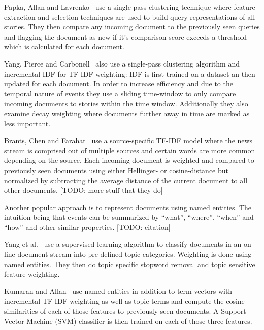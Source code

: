 Papka, Allan and Lavrenko~\cite{papka1998online} use a single-pass clustering technique where feature extraction and selection techniques are used to build query representations of all stories. They then compare any incoming document to the previously seen queries and flagging the document as new if it's comparison score exceeds a threshold which is calculated for each document.

Yang, Pierce and Carbonell~\cite{yang1998study} also use a single-pass clustering algorithm and incremental IDF for TF-IDF weighting: IDF is first trained on a dataset an then updated for each document. In order to increase efficiency and due to the temporal nature of events they use a sliding time-window to only compare incoming documents to stories within the time window. Additionally they also examine decay weighting where documents further away in time are marked as less important.

Brants, Chen and Farahat~\cite{brants2003system} use a source-specific TF-IDF model where the news stream is comprised out of multiple sources and certain words are more common depending on the source. Each incoming document is weighted and compared to previously seen documents using either Hellinger- or cosine-distance but normalized by subtracting the average distance of the current document to all other documents. [TODO: more stuff that they do]

Another popular approach is to represent documents using named entities. The intuition being that events can be summarized  by ``what'', ``where'', ``when'' and ``how'' and other similar properties. [TODO: citation]

Yang et al.~\cite{yang2002topic} use a supervised learning algorithm to classify documents in an on-line document stream into pre-defined topic categories. Weighting is done using named entities. They then do topic specific stopword removal and topic sensitive feature weighting.

Kumaran and Allan~\cite{kumaran2005using} use named entities in addition to term vectors with incremental TF-IDF weighting as well as topic terms and compute the cosine similarities of each of those features to previously seen documents. A Support Vector Machine (SVM) classifier is then trained on each of those three features.




